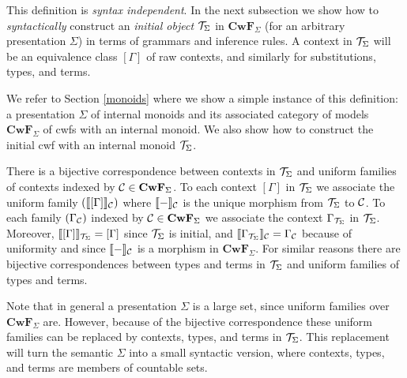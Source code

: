 \documentclass{lmcs}
\newcommand{\FYI}[1]{{\color{red}#1}}
\def\Cwf{\mathbf{CwF}}
\begin{document}
\begin{definition}
\end{definition}

This definition is {\em syntax independent}. In the next subsection we show how to {\em syntactically} construct an {\em initial object} ${\mathcal T}_{\Sigma}$ in $\Cwf_{\Sigma}$ (for an arbitrary \FYI{presentation} $\Sigma$) in terms of grammars and inference rules. A context in ${\mathcal T}_{\Sigma}$ will be an equivalence class $[ \Gamma ]$ of raw contexts, and similarly for substitutions, types, and terms.

We refer to Section \ref{monoids} where we show a simple instance of this definition: a \FYI{presentation} $\Sigma$ of internal monoids and its associated category of models $\Cwf_\Sigma$ of cwfs with an internal monoid. We also show how to construct the initial cwf with an internal monoid ${\mathcal T}_\Sigma$.

\begin{remark}
There is a bijective correspondence between contexts in ${\mathcal T}_\Sigma$ and uniform families of contexts
indexed by $\C \in \Cwf_\Sigma$. To each context $[ \Gamma ]$ in ${\mathcal T}_\Sigma$ we associate the uniform family $(\llbracket  [ \Gamma ]  \rrbracket_{\mathcal C})$ where $\llbracket - \rrbracket_{\mathcal C}$ is the unique morphism from ${\mathcal T}_\Sigma$ to ${\mathcal C}$. To each family $(\Gamma_{\mathcal C})$ indexed by $\C \in \Cwf_\Sigma$ we associate the context $\Gamma_{{\mathcal T}_\Sigma}$ in ${\mathcal T}_\Sigma$. Moreover, $\llbracket  [ \Gamma ]  \rrbracket_{{\mathcal T}_\Sigma} = [ \Gamma ]$ since ${\mathcal T}_\Sigma$ is initial, and  $\llbracket  {\Gamma_{{\mathcal T}_\Sigma}} \rrbracket_{\mathcal C}  = \Gamma_{\mathcal C}$ because of uniformity and since $\llbracket - \rrbracket_{\mathcal C}$ is a morphism in $\Cwf_{\Sigma}$. For similar reasons there are bijective correspondences between types and terms in ${\mathcal T}_\Sigma$ and uniform families of types and terms.
\end{remark}

\begin{remark}
Note that in general a \FYI{presentation} $\Sigma$ is a large set, since uniform families over $\Cwf_\Sigma$ are. However, because of the bijective correspondence these uniform families can be replaced by contexts, types, and terms in ${\mathcal T}_\Sigma$. This replacement will turn the semantic $\Sigma$ into a small syntactic version, where contexts, types, and terms are members of countable sets.
\end{remark}
\end{document}
